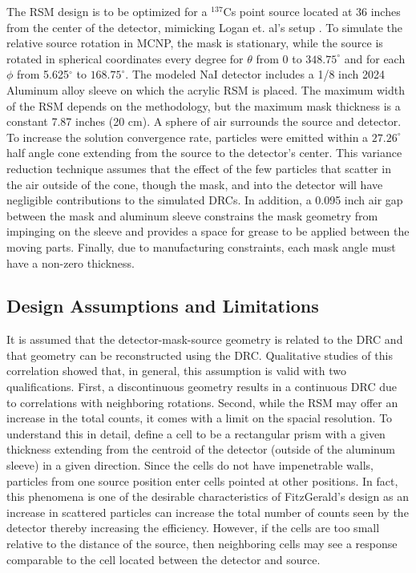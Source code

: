 \documentclass[3p,times]{elsarticle}
\begin{document}
The RSM design is to be optimized for a $^{137}$Cs point source located at 36 inches from the center of the detector, mimicking Logan et. al's setup \cite{Logan2017}.  
To simulate the relative source rotation in MCNP, the mask is stationary, while the source is rotated in spherical coordinates every degree for $\theta$ from 0 to $348.75^\circ$ and for each $\phi$ from 5.625$^\circ$ to $168.75^\circ$.  
The modeled NaI detector includes a 1/8 inch 2024 Aluminum alloy sleeve on which the acrylic RSM is placed. 
The maximum width of the RSM depends on the methodology, but the maximum mask thickness is a constant 7.87 inches (20 cm).  
A sphere of air surrounds the source and detector.  
To increase the solution convergence rate, particles were emitted within a $27.26^\circ$ half angle cone extending from the source to the detector's center.  
This variance reduction technique assumes that the effect of the few particles that 
scatter in the air outside of the cone, though the mask, and into the detector will have negligible contributions to the simulated DRCs.   
In addition, a 0.095 inch air gap between the mask and aluminum sleeve constrains the mask geometry from impinging on the sleeve and provides a space for grease to be applied between the moving parts.
Finally, due to manufacturing constraints, each mask angle must have a non-zero thickness.

\subsection{Design Assumptions and Limitations}
It is assumed that the detector-mask-source geometry is related to the DRC and that geometry can be reconstructed using the DRC.
Qualitative studies of this correlation showed that, in general, this assumption is valid with two qualifications.  
First, a discontinuous geometry results in a continuous DRC due to correlations with neighboring rotations. 
Second, while the RSM may offer an increase in the total counts, it comes with a limit on the spacial resolution. 
To understand this in detail, define a cell to be a rectangular prism with a given thickness extending from the centroid of the detector (outside of the aluminum sleeve) in a given direction.
Since the cells do not have impenetrable walls, particles from one source position enter cells pointed at other positions.  
In fact, this phenomena is one of the desirable characteristics of FitzGerald's design as an increase in scattered particles can increase the total number of counts seen by the detector thereby increasing the efficiency.  
However, if the cells are too small relative to the distance of the source, then neighboring cells may see a response comparable to the cell located between the detector and source.
\end{document}
